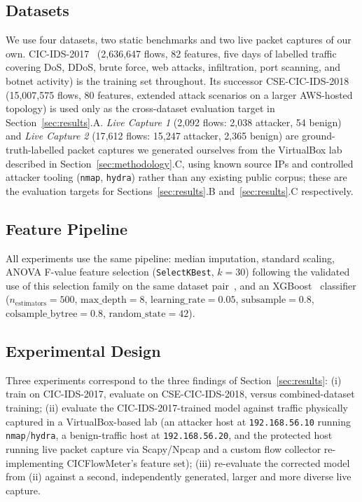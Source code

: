 \documentclass[conference]{IEEEtran}
\begin{document}
\subsection{Datasets}
We use four datasets, two static benchmarks and two live packet captures
of our own. CIC-IDS-2017~\cite{sharafaldin2018generating} (2{,}636{,}647
flows, 82 features, five days of labelled traffic covering DoS, DDoS,
brute force, web attacks, infiltration, port scanning, and botnet
activity) is the training set throughout. Its successor CSE-CIC-IDS-2018
(15{,}007{,}575 flows, 80 features, extended attack scenarios on a larger
AWS-hosted topology) is used only as the cross-dataset evaluation target
in Section~\ref{sec:results}.A. \emph{Live Capture 1} (2{,}092 flows:
2{,}038 attacker, 54 benign) and \emph{Live Capture 2} (17{,}612 flows:
15{,}247 attacker, 2{,}365 benign) are ground-truth-labelled packet
captures we generated ourselves from the VirtualBox lab described in
Section~\ref{sec:methodology}.C, using known source IPs and controlled
attacker tooling (\texttt{nmap}, \texttt{hydra}) rather than any existing
public corpus; these are the evaluation targets for
Sections~\ref{sec:results}.B and~\ref{sec:results}.C respectively.

\subsection{Feature Pipeline}
All experiments use the same pipeline: median imputation, standard
scaling, ANOVA F-value feature selection (\texttt{SelectKBest}, $k=30$)
following the validated use of this selection family on the same dataset
pair~\cite{zouhri2024filter}, and an XGBoost~\cite{chen2016xgboost}
classifier ($n_{\text{estimators}}{=}500$, $\text{max\_depth}{=}8$,
$\text{learning\_rate}{=}0.05$, $\text{subsample}{=}0.8$,
$\text{colsample\_bytree}{=}0.8$, $\text{random\_state}{=}42$).

\subsection{Experimental Design}
Three experiments correspond to the three findings of
Section~\ref{sec:results}: (i) train on CIC-IDS-2017, evaluate on
CSE-CIC-IDS-2018, versus combined-dataset training; (ii) evaluate the
CIC-IDS-2017-trained model against traffic physically captured in a
VirtualBox-based lab (an attacker host at \texttt{192.168.56.10} running
\texttt{nmap}/\texttt{hydra}, a benign-traffic host at
\texttt{192.168.56.20}, and the protected host running live packet
capture via Scapy/Npcap and a custom flow collector re-implementing
CICFlowMeter's feature set); (iii) re-evaluate the corrected model from
(ii) against a second, independently generated, larger and more diverse
live capture.
\end{document}
